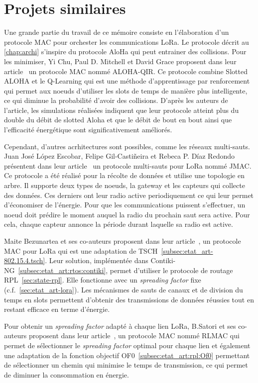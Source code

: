 \section{Projets similaires}\label{sec:etat_art-related-work}
\renewcommand{\rightmark}{Projet similaires}

Une grande partie du travail de ce mémoire consiste en l'élaboration d'un protocole MAC pour
orchester les communications LoRa. Le protocole décrit au \autoref{chap:archi} s'inspire du
protocole AloHa qui peut entrainer des collisions. Pour les minimiser, Yi Chu, Paul D. Mitchell et
David Grace proposent dans leur article~\cite{6328420} un protocole MAC nommé ALOHA-QIR. Ce
protocole combine Slotted ALOHA et le Q-Learning qui est une méthode d'apprentissage par
renforcement qui permet aux noeuds d'utiliser les slots de temps de manière plus intelligente, ce qui diminue la probabilité d'avoir des collisions. D'après les auteurs de l'article, les simulations réalisées indiquent que leur
protocole atteint plus du double du débit de slotted Aloha et que le débit de bout en bout ainsi
que l'efficacité énergétique sont significativement améliorés.


Cependant, d'autres acrhitectures sont possibles, comme les réseaux multi-sauts.
Juan José López Escobar, Felipe Gil-Castiñeira et Rebeca P. Díaz Redondo présentent dans leur article~\cite{s20236893} un protocole multi-sauts pour LoRa nommé JMAC. Ce protocole a été réalisé pour la récolte de données et utilise une topologie en arbre. Il supporte deux types de noeuds, la gateway et les capteurs qui collecte des données. Ces derniers ont leur radio active periodiquement ce qui leur permet d'économiser de l'énergie. Pour que les communications puissent s'effectuer, un noeud doit prédire le moment auquel la radio du prochain saut sera active. Pour cela, chaque capteur annonce la période durant laquelle sa radio est active.


Maite Bezunartea et ses co-auteurs proposent dans leur article~\cite{8847137}, un protocole MAC pour LoRa qui est une adaptation de TSCH~\ref{subsec:etat_art-802.15.4.tsch}. Leur solution, implémentée dans Contiki-NG~\ref{subsec:etat_art:rtos:contiki}, permet d'utiliser le protocole de routage RPL~\ref{sec:state-rpl}. Elle fonctionne avec un \textit{spreading factor} fixe (c.f.~\ref{sec:etat_art-lora}). Les mécanismes de sauts de canaux et de division du temps en slots permettent d'obtenir des transmissions de données réussies tout en restant efficace en terme d'énergie.

Pour obtenir un \textit{spreading factor} adapté à chaque lien LoRa, B.Satori et ses co-auteurs proposent dans leur article~\cite{8115756}, un protocole MAC nommé RLMAC qui permet de sélectionner le \textit{spreading factor} optimal pour chaque lien et également une adaptation de la fonction objectif OF0~\ref{subsec:etat_art:rpl:Of0} permettant de sélectionner un chemin qui minimise le temps de transmission, ce qui permet de diminuer la consommation en énergie.


